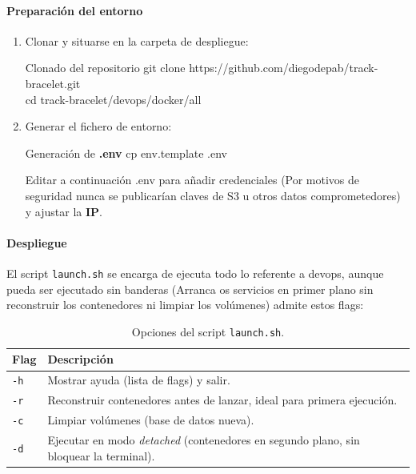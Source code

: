 \documentclass[12pt, a4paper]{article}
\begin{document}
\begin{umaappendices}
	\paragraph{Preparación del entorno}
	\begin{enumerate}
		\item Clonar y situarse en la carpeta de despliegue:
		\begin{Terminal}{Clonado del repositorio}
			git clone https://github.com/diegodepab/track-bracelet.git \\
			cd track-bracelet/devops/docker/all
		\end{Terminal}
		\item Generar el fichero de entorno:
		\begin{Terminal}{Generación de \textbf{.env}}
			cp env.template .env
		\end{Terminal}
		Editar a continuación .env para añadir credenciales (Por motivos de seguridad nunca se publicarían claves de S3 u otros datos comprometedores) y ajustar la \textbf{IP}.
	\end{enumerate}
	
	\paragraph{Despliegue}
	El script \texttt{launch.sh} se encarga de ejecuta todo lo referente a devops, aunque pueda ser ejecutado sin banderas (Arranca os servicios en primer plano sin reconstruir los contenedores ni limpiar los volúmenes) admite estos flags:
	\begin{table}[ht]
		\centering
		\begin{tabular}{@{}ll@{}}
			\toprule
			\textbf{Flag} & \textbf{Descripción} \\
			\midrule
			\texttt{-h} & Mostrar ayuda (lista de flags) y salir. \\
			\texttt{-r} & Reconstruir contenedores antes de lanzar, ideal para primera ejecución. \\
			\texttt{-c} & Limpiar volúmenes (base de datos nueva). \\
			\texttt{-d} & Ejecutar en modo \emph{detached} (contenedores en segundo plano, sin bloquear la terminal). \\
			\bottomrule
		\end{tabular}
		\caption{Opciones del script \texttt{launch.sh}.}
		\label{tab:launch_flags}
	\end{table}
	
	
	

\end{umaappendices}
\end{document}

